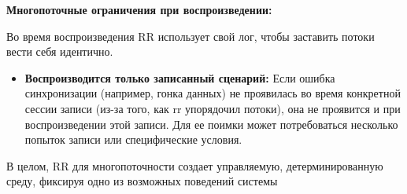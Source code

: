 \textbf{Многопоточные ограничения при воспроизведении:}

Во время воспроизведения RR использует свой лог, чтобы заставить потоки вести себя идентично.

\begin{itemize}

  \item \textbf{Воспроизводится только записанный сценарий:} Если ошибка
  синхронизации (например, гонка данных) не проявилась во время конкретной
  сессии записи (из-за того, как rr упорядочил потоки), она не проявится и при
  воспроизведении этой записи. Для ее поимки может потребоваться несколько
  попыток записи или специфические условия.

\end{itemize}

В целом, RR для многопоточности создает управляемую, детерминированную среду, фиксируя одно из возможных поведений системы

